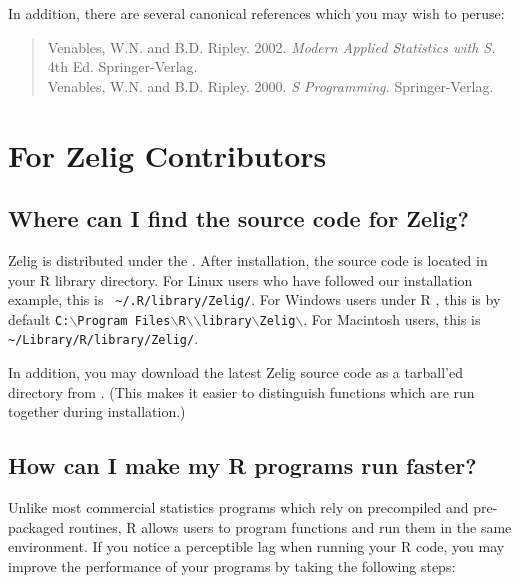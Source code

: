 In addition, there are several canonical references which you may
wish to peruse:
\begin{verse}
Venables, W.N. and B.D. Ripley.  2002. \emph{Modern Applied Statistics with S.} 4th Ed.  Springer-Verlag.  \\
Venables, W.N. and B.D. Ripley.  2000. \emph{S Programming.} Springer-Verlag.  \\
\end{verse}

\section{For Zelig Contributors}

\subsection*{Where can I find the source code for Zelig?}

Zelig is distributed under the .  After installation,
the source code is located in your R library directory.  For Linux
users who have followed our installation example, this is {\tt
\~{}/.R/library/Zelig/}.  For Windows users under R \fullrvers, this is by
default {\tt C:$\backslash$Program Files$\backslash$R$\backslash$\rwvers$\backslash$library$\backslash$Zelig$\backslash$}.
For Macintosh users, this is {\tt \~{}/Library/R/library/Zelig/}.

In addition, you may download the latest Zelig
source code as a tarball'ed directory from
.  
(This makes it easier to distinguish functions which are run together during installation.)

\subsection*{How can I make my R programs run faster?}

Unlike most commercial statistics programs which rely on precompiled
and pre-packaged routines, R allows users to program functions and run
them in the same environment.  If you notice a perceptible lag when
running your R code, you may improve the performance of your programs
by taking the following steps:

